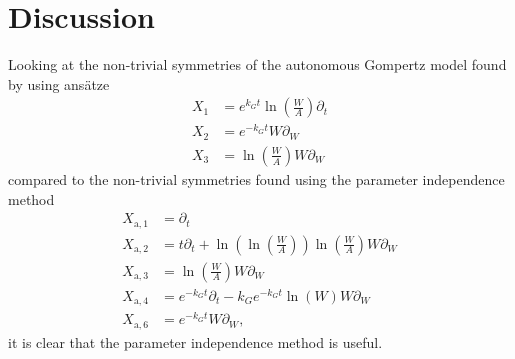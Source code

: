 \chapter{Discussion}

Looking at the non-trivial symmetries of the autonomous Gompertz model found by using ansätze
\begin{align}
  X_1 &= e^{k_G t} \ln(\frac{W}{A}) \partial_t \\
  X_2 &= e^{-k_G t} W \partial_W \\
  X_3 &= \ln(\frac{W}{A}) W \partial_W
\end{align}
compared to the non-trivial symmetries found using the parameter independence method
\begin{align}
  X_{\text{a},1} &= \partial_t \\
  X_{\text{a},2} &= t \partial_t + \ln(\ln(\frac{W}{A})) \ln(\frac{W}{A}) W \partial_W\\
  X_{\text{a},3} &= \ln(\frac{W}{A}) W \partial_W \\
  X_{\text{a},4} &= e^{-k_G t} \partial_t - k_G e^{-k_G t} \ln(W) W \partial_W\\
  X_{\text{a},6} &= e^{-k_G t} W \partial_W,
\end{align}
it is clear that the parameter independence method is useful.
